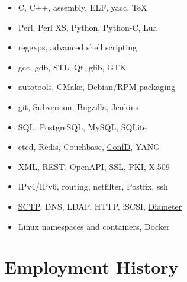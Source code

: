\documentclass[a4paper,12pt]{article}
\newcommand{\compress}{\setlength\itemsep{-\parskip}}
\newenvironment{compressedItemize}{\begin{itemize}\compress}{\end{itemize}}
\begin{document}
\begin{multicols}{2}
\begin{compressedItemize}
\item	C, C++, assembly, ELF, yacc, \TeX
\item	Perl, Perl XS, Python, Python-C, Lua
\item	regexps, advanced shell scripting
\item	gcc, gdb, STL, Qt, glib, GTK
\item	autotools, CMake, Debian/RPM packaging
\item	git, Subversion, Bugzilla, Jenkins
\columnbreak
\item	SQL, PostgreSQL, MySQL, SQLite
\item	etcd, Redis, Couchbase,
	\href{http://www.tail-f.com/confd-netconf-server}{ConfD}, YANG
\item	XML, REST,
	\href{http://en.wikipedia.org/wiki/OpenAPI_Specification}{OpenAPI},
	SSL, PKI, X.509
\item	IPv4/IPv6, routing, netfilter, Postfix, ssh
\item	\href{http://en.wikipedia.org/wiki/SCTP}{SCTP}, DNS, LDAP, HTTP,
	iSCSI, \href{http://tools.ietf.org/html/rfc6733}{Diameter}
\item	Linux namespaces and containers, Docker
\end{compressedItemize}
\end{multicols}

\section{Employment History}
\end{document}
